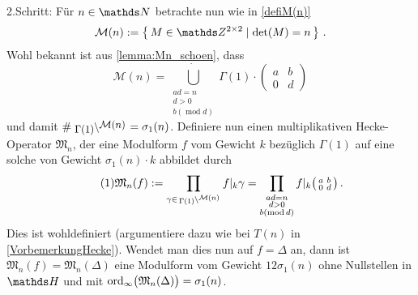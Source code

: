 \begin{bewe}
2.Schritt: Für $n \in \NN$ betrachte nun wie in \autoref{defiM(n)}
\[
\mathcal{M}(n) := \Set{M \in \ZZ^{2 \times 2} \mid \det (M) = n}
\,.
\]
Wohl bekannt ist aus \autoref{lemma:Mn_schoen}, dass 
\[
\mathcal{M}(n) = \dot{\bigcup_{\substack{ad = n\\ d > 0\\
b (\operatorname{mod} d)}}} \Gamma(1) \cdot 
\begin{pmatrix}
a & b\\
0 & d
\end{pmatrix}
\]
und damit $\# \linksmodulo{\Gamma(1)}{\mathcal{M}(n)} = \sigma_1(n)$. Definiere nun einen \glqq{}multiplikativen Hecke-Operator\grqq{} $\mathfrak{M}_n$, der eine Modulform $f$ vom Gewicht $k$ bezüglich $\Gamma(1)$ auf eine solche von Gewicht $\sigma_1 (n) \cdot k$ abbildet durch
\[
\label{Gl 1}\tag{1}
\mathfrak{M}_n (f) := \prod_{\gamma \in \linksmodulo{\Gamma(1)}{\mathcal M(n)}} f |_k \gamma = \prod_{\substack{ad = n\\ d > 0\\b (\operatorname{mod} d)}} f |_k \mymat{a}{b}{0}{d}
\,.
\]
Dies ist wohldefiniert (argumentiere dazu wie bei $T(n)$ in \autoref{VorbemerkungHecke}). Wendet man dies nun auf $f = \Delta$ an, dann ist $\mathfrak{M}_n(f) = \mathfrak{M}_n(\Delta)$ eine Modulform vom Gewicht $12 \sigma_1(n)$ ohne Nullstellen in $\HH$ und mit $\operatorname{ord}_\infty \bigl( \mathfrak{M}_n(\Delta) \bigr) = \sigma_1(n)$.


\end{bewe}
